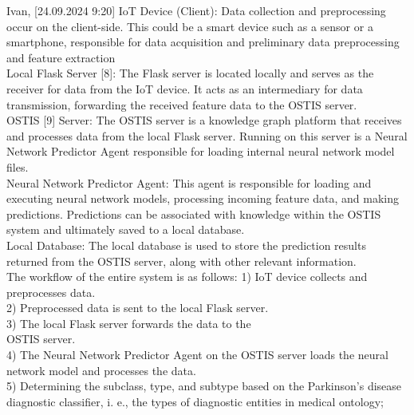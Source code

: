 \documentclass[a4paper,10pt,twocolumn]{article}
\begin{document}
\begin{flushleft}
Ivan, [24.09.2024 9:20]
\hspace{1cm} IoT Device (Client): Data collection and preprocessing
occur on the client-side. This could be a smart device
such as a sensor or a smartphone, responsible for data
acquisition and preliminary data preprocessing and feature extraction\\
\hspace{1cm}Local Flask Server [8]: The Flask server is located
locally and serves as the receiver for data from the IoT
device. It acts as an intermediary for data transmission,
forwarding the received feature data to the OSTIS server.\\
\hspace{1cm}OSTIS [9] Server: The OSTIS server is a knowledge
graph platform that receives and processes data from the
local Flask server. Running on this server is a Neural
Network Predictor Agent responsible for loading internal
neural network model files.\\
\hspace{1cm}Neural Network Predictor Agent: This agent is responsible for loading and executing neural network models,
processing incoming feature data, and making predictions. Predictions can be associated with knowledge
within the OSTIS system and ultimately saved to a local
database.\\
\hspace{1cm}Local Database: The local database is used to store the
prediction results returned from the OSTIS server, along
with other relevant information.\\
\hspace{1cm}The workflow of the entire system is as follows:
1) IoT device collects and preprocesses data.\\
2) Preprocessed data is sent to the local Flask server.\\
3) The local Flask server forwards the data to the\\
OSTIS server.\\
4) The Neural Network Predictor Agent on the OSTIS
server loads the neural network model and processes
the data.\\
5) Determining the subclass, type, and subtype based
on the Parkinson’s disease diagnostic classifier, i. e.,
the types of diagnostic entities in medical ontology;\\


\end{flushleft}
\end{document}
